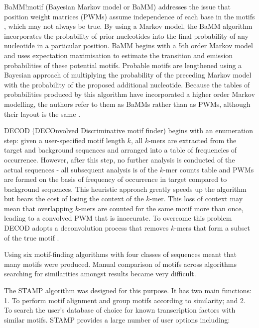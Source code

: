\documentclass[12pt]{article}
\begin{document}
BaMM!motif (Bayesian Markov model or BaMM) \citep{siebert2016bayesian} addresses the issue that position weight matrices (PWMs) assume independence of each base in the motifs \citep{Jayaram2016}, which may not always be true. By using a Markov model, the BaMM algorithm incorporates the probability of prior nucleotides into the final probability of any nucleotide in a particular position. BaMM begins with a 5th order Markov model and uses expectation maximisation to estimate the transition and emission probabilities of these potential motifs. Probable motifs are lengthened using a Bayesian approach of multiplying the probability of the preceding Markov model with the probability of the proposed additional nucleotide. Because the tables of probabilities produced by this algorithm have incorporated a higher order Markov modelling, the authors refer to them as BaMMs rather than as PWMs, although their layout is the same \citep{siebert2016bayesian}.

DECOD (DECOnvolved Discriminative motif finder) \citep{huggins2011decod} begins with an enumeration step: given a user-specified motif length $k$, all $k$-mers are extracted from the target and background sequences and arranged into a table of frequencies of occurrence. However, after this step, no further analysis is conducted of the actual sequences - all subsequent analysis is of the $k$-mer counts table and PWMs are formed on the basis of frequency of occurrence in target compared to background sequences. This heuristic approach greatly speeds up the algorithm but bears the cost of losing the context of the $k$-mer. This loss of context may mean that overlapping $k$-mers are counted for the same motif more than once, leading to a convolved PWM that is inaccurate. To overcome this problem DECOD adopts a deconvolution process that removes $k$-mers that form a subset of the true motif  \citep{huggins2011decod}.

Using six motif-finding algorithms with four classes of sequences meant that many motifs were produced. Manual comparison of motifs across algorithms searching for similarities amongst results became very difficult. 

The STAMP algorithm \citep{mahony2007stamp} was designed for this purpose. It has two main functions:
1. To perform motif alignment and group motifs according to similarity; and
2. To search the user's database of choice for known transcription factors with similar motifs.  STAMP provides a large number of user options including:
\end{document}
